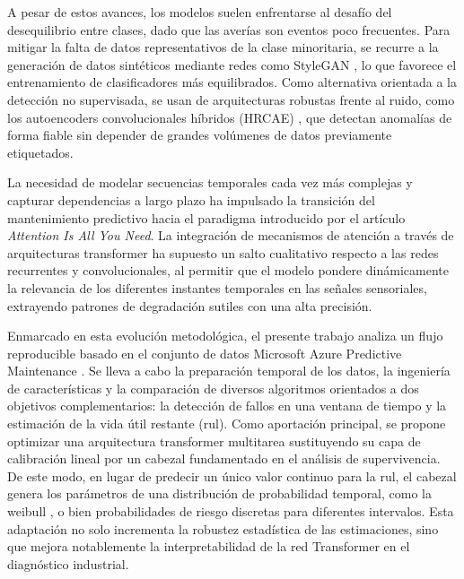 \documentclass[IB]{TFUOC}
\begin{document}
A pesar de estos avances, los modelos suelen enfrentarse al desafío del desequilibrio entre clases, dado que las averías
son eventos poco frecuentes. Para mitigar la falta de datos representativos de la clase minoritaria, se recurre a la
generación de datos sintéticos mediante redes como StyleGAN \cite{kim2023self}, lo que favorece el entrenamiento de
clasificadores más equilibrados. Como alternativa orientada a la detección no supervisada, se usan de arquitecturas
robustas frente al ruido, como los autoencoders convolucionales híbridos (HRCAE) \cite{yan2023hybrid}, que detectan
anomalías de forma fiable sin depender de grandes volúmenes de datos previamente etiquetados.

La necesidad de modelar secuencias temporales cada vez más complejas y capturar dependencias a largo plazo ha impulsado
la transición del mantenimiento predictivo hacia el paradigma introducido por el artículo \textit{Attention Is All You Need}\cite{vaswani2017attention_neurips}.
La integración de mecanismos de atención a través de arquitecturas \gls{transformer} ha supuesto un salto cualitativo
respecto a las redes recurrentes y convolucionales, al permitir que el modelo pondere dinámicamente la relevancia de los
diferentes instantes temporales en las señales sensoriales, extrayendo patrones de degradación sutiles con una alta
precisión.

Enmarcado en esta evolución metodológica, el presente trabajo analiza un flujo reproducible basado en el conjunto de
datos Microsoft Azure Predictive Maintenance \cite{biswas_microsoft_azure_predictive_maintenance}. Se lleva a cabo la
preparación temporal de los datos, la ingeniería de características y la comparación de diversos algoritmos orientados a
dos objetivos complementarios: la detección de fallos en una ventana de tiempo y la estimación de la vida útil restante
(\gls{rul}). Como aportación principal, se propone optimizar una arquitectura \gls{transformer} multitarea \cite{liu2026transformer}
sustituyendo su capa de calibración lineal por un cabezal fundamentado en el análisis de supervivencia. De este modo, en
lugar de predecir un único valor continuo para la \gls{rul}, el cabezal genera los parámetros de una distribución de
probabilidad temporal, como la \gls{weibull} \cite{maragallcambra2018}, o bien probabilidades de riesgo discretas para
diferentes intervalos. Esta adaptación no solo incrementa la robustez estadística de las estimaciones, sino que mejora
notablemente la interpretabilidad de la red Transformer en el diagnóstico industrial.
\end{document}
